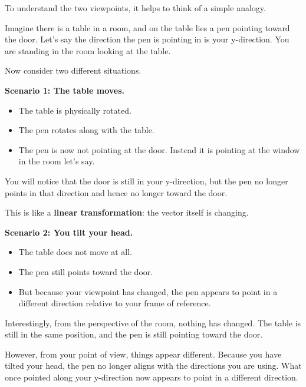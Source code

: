 \documentclass[11pt,openany]{book}
\theoremstyle{definition}
\begin{document}
To understand the two viewpoints, it helps to think of a simple analogy.

\medskip

Imagine there is a table in a room, and on the table lies a pen pointing toward the door. Let's say the direction the pen is pointing in is your y-direction.
You are standing in the room looking at the table.

\medskip

Now consider two different situations.

\medskip

\textbf{Scenario 1: The table moves.}

\begin{itemize}
  \item The table is physically rotated.
  \item The pen rotates along with the table.
  \item The pen is now not pointing at the door. Instead it is pointing at the window in the room let's say.
\end{itemize}

You will notice that the door is still in your y-direction, but the pen no longer points in that direction and hence no longer toward the door.

This is like a \textbf{linear transformation}: the vector itself is changing.

\medskip

\textbf{Scenario 2: You tilt your head.}

\begin{itemize}
  \item The table does not move at all.
  \item The pen still points toward the door.
  \item But because your viewpoint has changed, the pen appears to point in a different direction relative to your frame of reference.
\end{itemize}

Interestingly, from the perspective of the room, nothing has changed.
The table is still in the same position, and the pen is still pointing toward the door.

\medskip

However, from your point of view, things appear different.
Because you have tilted your head, the pen no longer aligns with the directions you are using.
What once pointed along your y-direction now appears to point in a different direction.
\end{document}
